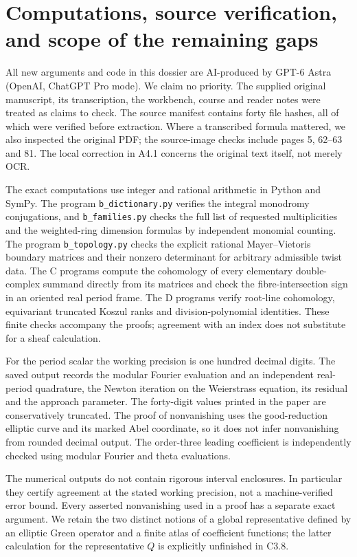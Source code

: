\section{Computations, source verification, and scope of the remaining gaps}

All new arguments and code in this dossier are AI-produced by GPT-6 Astra
(OpenAI, ChatGPT Pro mode). We claim no priority. The supplied original
manuscript, its transcription, the workbench, course and reader notes
were treated as claims to check. The source manifest contains forty
file hashes, all of which were verified before extraction. Where a
transcribed formula mattered, we also inspected the original PDF;
the source-image checks include pages 5, 62--63 and 81. The local
correction in A4.1 concerns the original text itself, not merely OCR.

The exact computations use integer and rational arithmetic in Python
and SymPy. The program \texttt{b\_dictionary.py} verifies the integral
monodromy conjugations, and \texttt{b\_families.py} checks the full list
of requested multiplicities and the weighted-ring dimension formulas
by independent monomial counting. The program \texttt{b\_topology.py}
checks the explicit rational Mayer--Vietoris boundary matrices and
their nonzero determinant for arbitrary admissible twist data.
The C programs compute the
cohomology of every elementary double-complex summand directly from
its matrices and check the fibre-intersection sign in an oriented
real period frame. The D programs verify root-line cohomology,
equivariant truncated Koszul ranks and division-polynomial identities.
These finite checks accompany the proofs; agreement with an index
does not substitute for a sheaf calculation.

For the period scalar the working precision is one hundred decimal
digits. The saved output records the modular Fourier evaluation and
an independent real-period quadrature, the Newton iteration on the
Weierstrass equation, its residual and the approach parameter. The
forty-digit values printed in the paper are conservatively truncated.
The proof of nonvanishing uses the good-reduction elliptic curve and
its marked Abel coordinate, so it does not infer nonvanishing from
rounded decimal output. The order-three leading coefficient is
independently checked using modular Fourier and theta evaluations.

The numerical outputs do not contain rigorous interval enclosures.
In particular they certify agreement at the stated working precision,
not a machine-verified error bound. Every asserted nonvanishing used
in a proof has a separate exact argument. We retain the two distinct
notions of a global representative defined by an elliptic Green
operator and a finite atlas of coefficient functions; the latter
calculation for the representative $Q$ is explicitly unfinished in C3.8.

